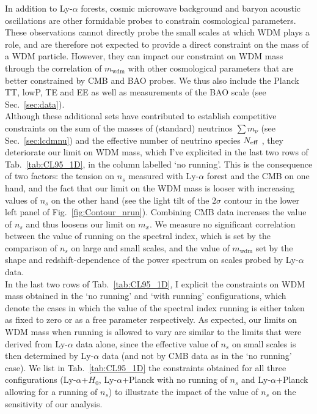 In addition to Ly-$\alpha$ forests, cosmic microwave background and baryon acoustic oscillations are other formidable probes to constrain cosmological parameters. These observations cannot directly probe the small scales at which WDM plays a role, and are therefore not expected to provide a direct constraint on the mass of a WDM particle. However, they can impact our constraint on WDM mass through the correlation of $m_{\mathrm{wdm}}$ with other cosmological parameters that are better constrained by CMB and BAO probes. We thus also include the Planck TT, lowP, TE and EE as well as measurements of the BAO scale (see Sec.~\ref{sec:data}). \\

Although these additional sets have contributed to establish competitive constraints on the sum of the masses of (standard) neutrinos $\sum m_\nu$ (see Sec.~\ref{sec:lcdmnu}) and the effective number of neutrino species $N_{\rm eff}$ \cite{Rossi2015}, they deteriorate our limit on WDM mass, which I've explicited in the last two rows of Tab.~\ref{tab:CL95_1D}, in the column labelled `no running'. This is the consequence of two factors: the tension on $n_s$ measured with Ly-$\alpha$ forest and the CMB on one hand, and the fact that our limit on the WDM mass is looser with increasing values of $n_s$ on the other hand (see the light tilt of the $2 \sigma$ contour in the lower left panel of Fig.~\ref{fig:Contour_nrun}). Combining CMB data increases the value of $n_s$ and thus loosens our limit on $m_x$. We measure no significant correlation between the value of running on the spectral index, which is set by the comparison of $n_s$ on large and small scales, and the value of $m_{\mathrm{wdm}}$ set by the shape and redshift-dependence of the power spectrum on scales probed by Ly-$\alpha$ data. \\

In the last two rows of Tab.~\ref{tab:CL95_1D}, I explicit the constraints on WDM mass obtained in the `no running' and `with running' configurations, which denote the cases in which the value of the spectral index running is either taken as fixed to zero or as a free parameter respectively. As expected, our limits on WDM mass when running is allowed to vary are similar to the limits that were derived from Ly-$\alpha$ data alone, since the effective value of $n_s$ on small scales is then determined by Ly-$\alpha$ data (and not by CMB data as in the `no running' case). We list in Tab.~\ref{tab:CL95_1D} the constraints obtained  for all three configurations (Ly-$\alpha$+$H_0$, Ly-$\alpha$+Planck with no running of $n_s$ and Ly-$\alpha$+Planck allowing for a running of $n_s$) to illustrate the impact of the value of $n_s$ on the sensitivity of our analysis. \\

